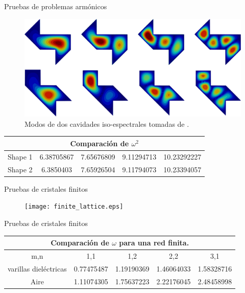 \documentclass[xcolor=table,serif,handout]{beamer}
\begin{document}
	\begin{frame}{Pruebas de problemas armónicos}
		\begin{figure}
		\centering
		\includegraphics[scale=0.11]{isoespectral.eps}
		\caption{Modos de dos cavidades iso-espectrales tomadas de \cite{Chapman1995}.}
		\label{fig:isoespectral_waveguide}
		\end{figure}
		\small
		\begin{center}
		\begin{tabular}{|c|c|c|c|c|}
		\hline
		\multicolumn{5}{|c|}{Comparación de $\omega^2$} \\
		\hline 
Shape 1  & 6.38705867 & 7.65676809 & 9.11294713 & 10.23292227 \\ 
		\hline 
Shape 2 & 6.3850403 & 7.65926504 & 9.11794073 & 10.23394057 \\ 
		\hline 
		\end{tabular}
		\end{center}
	\end{frame}
	\begin{frame}{Pruebas de cristales finitos}
		\begin{figure}
		\centering
		\texttt{[image: finite\_lattice.eps]}
		\end{figure}
	\end{frame}
	\begin{frame}{Pruebas de cristales finitos}
	\small
	\begin{center}
		\begin{tabular}{|c|c|c|c|c|}
		\hline
		\multicolumn{5}{|c|}{Comparación de $\omega$ para una red finita.} \\
\hline 
m,n & 1,1 & 1,2 & 2,2 & 3,1 \\ 
\hline 
varillas dieléctricas & 0.77475487 & 1.19190369 & 1.46064033 & 1.58328716 \\ 
\hline 
Aire  & 1.11074305 & 1.75637223 & 2.22176045 & 2.48458998 \\ 
\hline 
\end{tabular}

\end{center}
	\end{frame}
\end{document}
